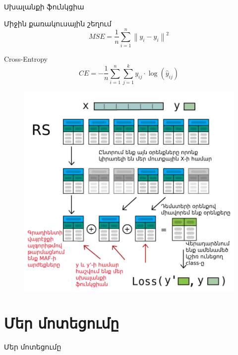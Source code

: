 \documentclass[aspectratio=169]{beamer}
\begin{document}
\begin{frame}{Սխալանքի ֆունկցիա}
    \begin{block}{Միջին քառակուսային շեղում}
        \begin{equation}
MSE = \frac{1}{n} \sum_{i=1}^{n} \left\| y_i - \hat{y}_i \right\|^2
        \end{equation}
    \end{block}
    \begin{block}{{\rm Cross-Entropy}}
        \begin{equation}
        CE = - \frac{1}{n} \sum_{i=1}^{n} \sum_{j=1}^{k} y_{ij} \cdot \log(\hat{y}_{ij})
        \end{equation}
    
    \end{block}
        
\end{frame}
\begin{figure}
    \centering
    \includegraphics[width=0.55\linewidth]{dst_ill.png}
\end{figure}




\section{Մեր մոտեցումը}
\begin{frame}
    \begin{center}
        \Huge Մեր մոտեցումը
    \end{center}
\end{frame}
\end{document}
